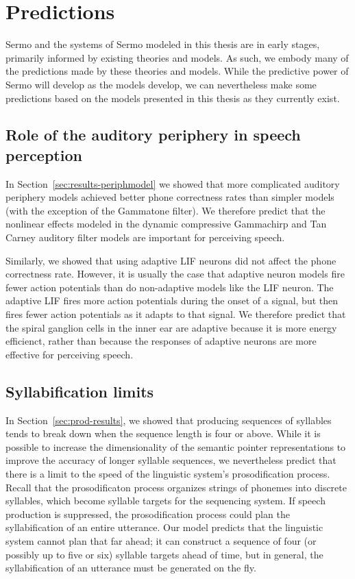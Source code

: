 \section{Predictions}

Sermo and the systems of Sermo modeled in this thesis
are in early stages,
primarily informed by existing
theories and models.
As such, we embody many of the predictions made
by these theories and models.
While the predictive power of Sermo
will develop as the models develop,
we can nevertheless make some predictions
based on the models presented in this thesis
as they currently exist.

\subsection{Role of the auditory periphery in speech perception}

In Section~\ref{sec:results-periphmodel} we showed
that more complicated auditory periphery models
achieved better phone correctness rates
than simpler models
(with the exception of the Gammatone filter).
We therefore predict that
the nonlinear effects modeled
in the dynamic compressive Gammachirp
and Tan Carney auditory filter models
are important for perceiving speech.

Similarly, we showed that using adaptive LIF neurons
did not affect the phone correctness rate.
However, it is usually the case that
adaptive neuron models fire fewer action potentials
than do non-adaptive models like the LIF neuron.
The adaptive LIF fires more action potentials
during the onset of a signal,
but then fires fewer action potentials
as it adapts to that signal.
We therefore predict that
the spiral ganglion cells in the inner ear
are adaptive because it is more energy efficienct,
rather than because the responses
of adaptive neurons are more effective
for perceiving speech.

\subsection{Syllabification limits}

In Section~\ref{sec:prod-results},
we showed that producing
sequences of syllables
tends to break down
when the sequence length is four or above.
While it is possible to increase the
dimensionality of the
semantic pointer representations
to improve the accuracy
of longer syllable sequences,
we nevertheless predict that
there is a limit to the speed
of the linguistic system's
prosodification process.
Recall that the prosodificaton process
organizes strings of phonemes
into discrete syllables,
which become syllable targets for
the sequencing system.
If speech production is suppressed,
the prosodification process
could plan the syllabification
of an entire utterance.
Our model predicts that
the linguistic system
cannot plan that far ahead;
it can construct a sequence of four
(or possibly up to five or six)
syllable targets ahead of time,
but in general,
the syllabification of an utterance
must be generated on the fly.

